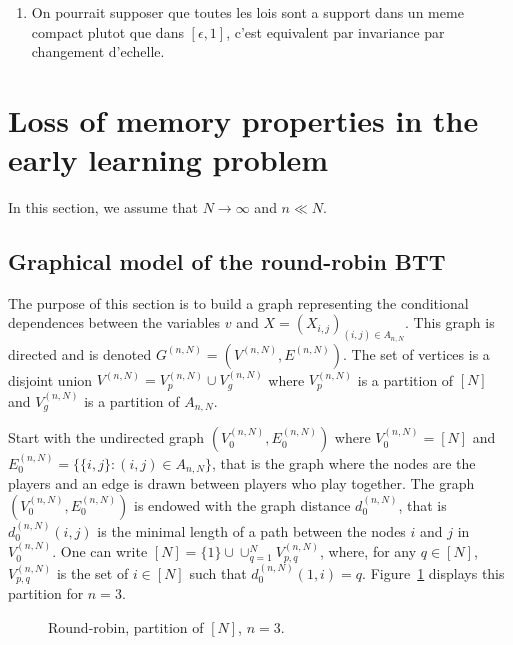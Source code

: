 \begin{enumerate}
\item On pourrait supposer que toutes les lois sont a support dans un meme compact plutot que dans $[\epsilon,1]$, c'est equivalent par invariance par changement d'echelle.
\end{enumerate}

\section{Loss of memory properties in the early learning problem}

In this section, we assume that $N\to\infty$ and $n\ll N$.

\subsection{Graphical model of the round-robin BTT}
The purpose of this section is to build a graph representing the conditional dependences between the variables $v$ and $X=(X_{i,j})_{(i,j)\in A_{n,N}}$. This graph is directed and is denoted $G^{(n,N)}=(V^{(n,N)},E^{(n,N)})$. The set of vertices is a disjoint union $V^{(n,N)}=V^{(n,N)}_{p}\cup V^{(n,N)}_g$ where $V^{(n,N)}_p$ is a partition of $[N]$ and $V^{(n,N)}_g$ is a partition of $ A_{n,N}$. 

Start with the undirected graph $(V^{(n,N)}_0,E^{(n,N)}_0)$ where $V^{(n,N)}_0=[N]$ and $E^{(n,N)}_0=\{\{i,j\} : (i,j)\in A_{n,N}\}$, that is the graph where the nodes are the players and an edge is drawn between players who play together. The graph $(V^{(n,N)}_0,E^{(n,N)}_0)$ is endowed with the graph distance $d^{(n,N)}_0$, that is $d^{(n,N)}_0(i,j)$ is the minimal length of a path between the nodes $i$ and $j$ in $V^{(n,N)}_0$. One can write $[N]=\{1\}\cup\cup_{q=1}^{N}V^{(n,N)}_{p,q}$, where, for any $q\in[N]$, $V^{(n,N)}_{p,q}$ is the set of $i\in[N]$ such that $d^{(n,N)}_0(1,i)=q$. Figure~\ref{fig:robin:partitionP} displays this partition for $n = 3$.

\begin{figure}
\centering
{}
\caption{Round-robin, partition of $[N]$, $n=3$.}
\label{fig:robin:partitionP}
\end{figure}


